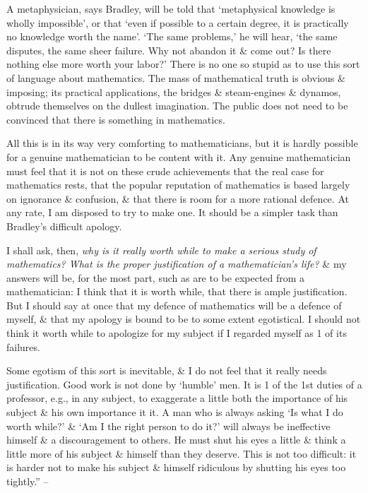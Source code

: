 \documentclass{article}
\numberwithin{equation}{section}
\begin{document}
A metaphysician, says Bradley, will be told that `metaphysical knowledge is wholly impossible', or that `even if possible to a certain degree, it is practically no knowledge worth the name'. `The same problems,' he will hear, `the same disputes, the same sheer failure. Why not abandon it \& come out? Is there nothing else more worth your labor?' There is no one so stupid as to use this sort of language about mathematics. The mass of mathematical truth is obvious \& imposing; its practical applications, the bridges \& steam-engines \& dynamos, obtrude themselves on the dullest imagination. The public does not need to be convinced that there is something in mathematics.

All this is in its way very comforting to mathematicians, but it is hardly possible for a genuine mathematician to be content with it. Any genuine mathematician must feel that it is not on these crude achievements that the real case for mathematics rests, that the popular reputation of mathematics is based largely on ignorance \& confusion, \& that there is room for a more rational defence. At any rate, I am disposed to try to make one. It should be a simpler task than Bradley's difficult  apology.

I shall ask, then, \textit{why is it really worth while to make a serious study of mathematics? What is the proper justification of a mathematician's life?} \& my answers will be, for the most part, such as are to be expected from a mathematician: I think that it is worth while, that there is ample justification. But I should say at once that my defence of mathematics will be a defence of myself, \& that my apology is bound to be to some extent egotistical.  I should not think it worth while to apologize for my subject if I regarded myself as 1 of its failures.

Some egotism of this sort is inevitable, \& I do not feel that it really needs justification. Good work is not done by `humble' men. It is 1 of the 1st duties of a professor, e.g., in any subject, to exaggerate a little both the importance of his subject \& his own importance it it. A man who is always asking `Is what I do worth while?' \& `Am I the right person to do it?' will always be ineffective himself \& a discouragement to others. He must shut his eyes a little \& think a little more of his subject \& himself than they deserve. This is not too difficult: it is harder not to make his subject \& himself ridiculous by shutting his eyes too tightly.'' -- \cite[pp. 63--66]{Hardy1992}
\end{document}

